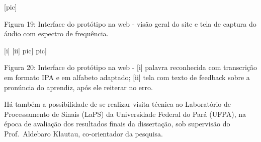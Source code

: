                                 [pic]

Figura 19: Interface do prot\'otipo na web - vis\~ao geral do site e tela de
captura do \'audio com espectro de frequ\^encia.

\textbar{} {[}i{]} \textbar{} {[}ii{]} \textbar{} \textbar{}{[}pic{]}
\textbar{}{[}pic{]} \textbar{}

Figura 20: Interface do prot\'otipo na web - {[}i{]} palavra reconhecida
com transcri\c{c}\~ao em formato IPA e em alfabeto adaptado; {[}ii{]} tela com
texto de feedback sobre a pron\'uncia do aprendiz, ap\'os ele reiterar no
erro.

H\'a tamb\'em a possibilidade de se realizar visita t\'ecnica ao Laborat\'orio
de Processamento de Sinais (LaPS) da Universidade Federal do Par\'a
(UFPA), na \'epoca de avalia\c{c}\~ao dos resultados finais da disserta\c{c}\~ao, sob
supervis\~ao do Prof.~Aldebaro Klautau, co-orientador da pesquisa.
